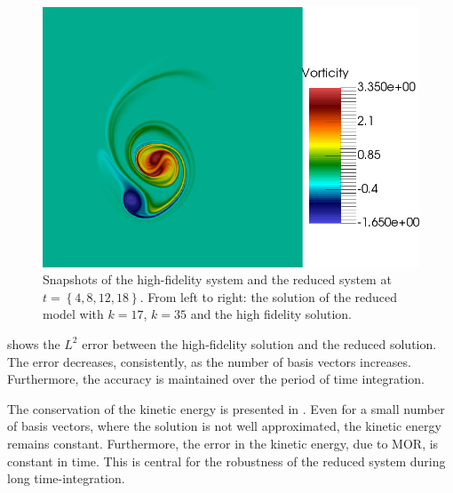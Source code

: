 \begin{figure}[t]
\includegraphics[scale=0.06]{data/Incompressible_Euler/Snapshots/Full_5.png}

\caption{Snapshots of the high-fidelity system and the reduced system at $t=\left\{ 4,8,12,18 \right\}$. From left to right: the solution of the reduced model with $k=17$, $k=35$ and the high fidelity solution.}
\label{p4.fig:snap_solution_incompressible_Euler}
\end{figure}

 shows the $L^2$ error between the high-fidelity solution and the reduced solution. The error decreases, consistently, as the number of basis vectors increases. Furthermore, the accuracy is maintained over the period of time integration.

The conservation of the kinetic energy is presented in . Even for a small number of basis vectors, where the solution is not well approximated, the kinetic energy remains constant. Furthermore, the error in the kinetic energy, due to MOR, is constant in time. This is central for the robustness of the reduced system during long time-integration.


